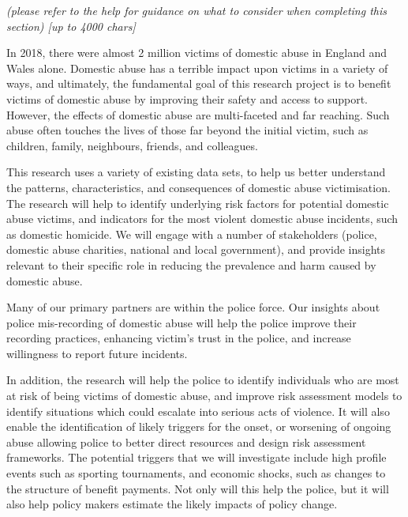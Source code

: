 \documentclass[11pt, a4paper]{article}
\begin{document}
%
%
%
%
%
%
%
%



\textit{(please refer to the help for guidance on what to consider when completing this section) [up to 4000 chars]}

In 2018, there were almost 2 million victims of domestic abuse in England and Wales alone. Domestic abuse has a terrible impact upon victims in a variety of ways, and ultimately, the fundamental goal of this research project is to benefit victims of domestic abuse by improving their safety and access to support. However, the effects of domestic abuse are multi-faceted and far reaching. Such abuse often touches the lives of those far beyond the initial victim, such as children, family, neighbours, friends, and colleagues. 

This research uses a variety of existing data sets, to help us better understand the patterns, characteristics, and consequences of domestic abuse victimisation. The research will help to identify underlying risk factors for potential domestic abuse victims, and indicators for the most violent domestic abuse incidents, such as domestic homicide. We will engage with a number of stakeholders (police, domestic abuse charities, national and local government), and provide insights relevant to their specific role in reducing the prevalence and harm caused by domestic abuse. 

Many of our primary partners are within the police force. Our insights about police mis-recording of domestic abuse will help the police improve their recording practices, enhancing victim's trust in the police, and increase willingness to report future incidents.

In addition, the research will help the police to identify individuals who are most at risk of being victims of domestic abuse, and improve risk assessment models to identify situations which could escalate into serious acts of violence. It will also enable the identification of likely triggers for the onset, or worsening of ongoing abuse allowing police to better direct resources and design risk assessment frameworks. The potential triggers that we will investigate include high profile events such as sporting tournaments, and economic shocks, such as changes to the structure of benefit payments. Not only will this help the police, but it will also help policy makers estimate the likely impacts of policy change.
\end{document}
